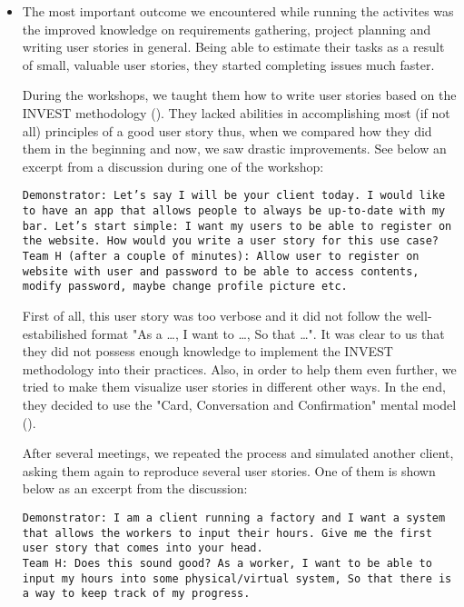 \documentclass[11pt]{article}
\begin{document}
\begin{itemize}

\item The most important outcome we encountered while running the activites was the improved knowledge on requirements gathering, project planning and writing user stories in general. Being able to estimate their tasks as a result of small, valuable user stories, they started completing issues much faster. 

During the workshops, we taught them how to write user stories based on the INVEST methodology (\citet{invest}). They lacked abilities in accomplishing most (if not all) principles of a good user story thus, when we compared how they did them in the beginning and now, we saw drastic improvements. See below an excerpt from a discussion during one of the workshop:

\texttt{Demonstrator: Let's say I will be your client today. I would like to have an app that allows people to always be up-to-date with my bar. Let's start simple: I want my users to be able to register on the website. How would you write a user story for this use case?\\
Team H (after a couple of minutes): Allow user to register on website with user and password to be able to access contents, modify password, maybe change profile picture etc.}

First of all, this user story was too verbose and it did not follow the well-estabilished format "As a \dots, I want to \dots, So that \dots". It was clear to us that they did not possess enough knowledge to implement the INVEST methodology into their practices. Also, in order to help them even further, we tried to make them visualize user stories in different other ways. In the end, they decided to use the "Card, Conversation and Confirmation" mental model (\citet{primer}). 

After several meetings, we repeated the process and simulated another client, asking them again to reproduce several user stories. One of them is shown below as an excerpt from the discussion:

\texttt{Demonstrator: I am a client running a factory and I want a system that allows the workers to input their hours. Give me the first user story that comes into your head.
\\
Team H: Does this sound good? As a worker, I want to be able to input my hours into some physical/virtual system, So that there is a way to keep track of my progress.}


\end{itemize}
\end{document}
